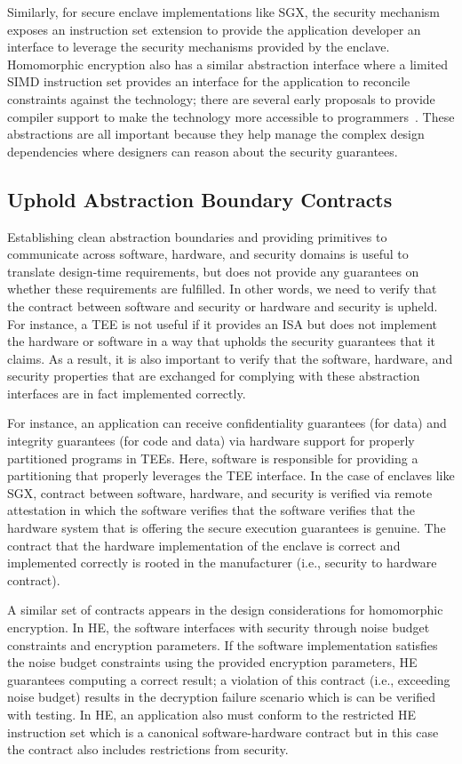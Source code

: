 Similarly, for secure enclave implementations like SGX, the security mechanism exposes an instruction set extension to provide the application developer an interface to leverage the security mechanisms provided by the enclave.
Homomorphic encryption also has a similar abstraction interface where a limited SIMD instruction set provides an interface for the application to reconcile constraints against the technology; there are several early proposals to provide compiler support to make the technology more accessible to programmers~\cite{eva, chet}.
These abstractions are all important because they help manage the complex design dependencies where designers can reason about the security guarantees.

\subsection{Uphold Abstraction Boundary Contracts}

Establishing clean abstraction boundaries and providing primitives to communicate across software, hardware, and security domains is useful to translate design-time requirements, but does not provide any guarantees on whether these requirements are fulfilled.
In other words, we need to verify that the contract between software and security or hardware and security is upheld.
For instance, a TEE is not useful if it provides an ISA but does not implement the hardware or software in a way that upholds the security guarantees that it claims.
As a result, it is also important to verify that the software, hardware, and security properties that are exchanged for complying with these abstraction interfaces are in fact implemented correctly.

For instance, an application can receive confidentiality guarantees (for data) and integrity guarantees (for code and data) via hardware support for properly partitioned programs in TEEs.
Here, software is responsible for providing a partitioning that properly leverages the TEE interface.
In the case of enclaves like SGX, contract between software, hardware, and security is verified via remote attestation in which the software verifies that the software verifies that the hardware system that is offering the secure execution guarantees is genuine.
The contract that the hardware implementation of the enclave is correct and implemented correctly is rooted in the manufacturer (i.e., security to hardware contract).

A similar set of contracts appears in the design considerations for homomorphic encryption.
In HE, the software interfaces with security through noise budget constraints and encryption parameters.
If the software implementation satisfies the noise budget constraints using the provided encryption parameters, HE guarantees computing a correct result; a violation of this contract (i.e., exceeding noise budget) results in the decryption failure scenario which is can be verified with testing.
In HE, an application also must conform to the restricted HE instruction set which is a canonical software-hardware contract but in this case the contract also includes restrictions from security.

